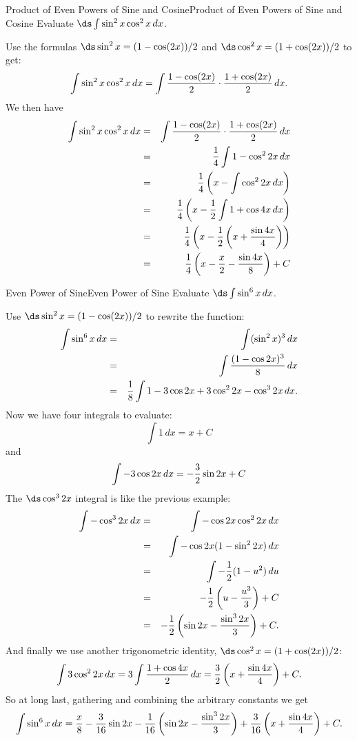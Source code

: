 \begin{example}{Product of Even Powers of Sine and Cosine}{Product of Even Powers of Sine and Cosine}\label{Product of Even Powers of Sine and Cosine}
Evaluate $\ds\int \sin^2x\cos^2x\,dx$. 
\end{example}

\begin{solution} 
Use the formulas
$\ds \sin^2x =(1-\cos(2x))/2$ and $\ds \cos^2x =(1+\cos(2x))/2$ to get:
$$
  \int \sin^2x\cos^2x\,dx=\int {1-\cos(2x)\over2}\cdot
  {1+\cos(2x)\over2}\,dx.
$$
We then have
\begin{eqnarray*}
\int \sin^2x\cos^2x\,dx&=&\int {1-\cos(2x)\over2}\cdot{1+\cos(2x)\over2}\,dx\\
&=&{1\over4}\int 1-\cos^2 2x\,dx\\
&=&{1\over4}\left(x-\int\cos^2 2x\,dx\right)\\
&=&{1\over4}\left(x-{1\over2}\int 1+\cos4x \,dx\right)\\
&=&{1\over4}\left(x-{1\over2}\left(x+{\sin 4x\over 4}\right)\right)\\
&=&{1\over4}\left(x-{x\over2}-{\sin 4x\over 8}\right)+C
\end{eqnarray*}
\end{solution}


\begin{example}{Even Power of Sine}{Even Power of Sine}\label{Even Power of Sine}
Evaluate $\ds\int \sin^6 x\,dx$.
\end{example}

\begin{solution} 
Use $\ds \sin^2x =(1-\cos(2x))/2$ to
rewrite the function:
\begin{eqnarray*}
  \int \sin^6 x\,dx&=&\int (\sin^2 x)^3\,dx\\
	&=&\int {(1-\cos 2x)^3\over 8}\,dx\\
  &=&{1\over 8}\int 1-3\cos 2x+3\cos^2 2x-\cos^3 2x\,dx.
\end{eqnarray*}
Now we have four integrals to evaluate:
$$\int 1\,dx=x+C$$
and
$$\int -3\cos 2x\,dx = -{3\over 2}\sin 2x+C$$
The $\ds \cos^3 2x$ integral is like the previous example:
\begin{eqnarray*}
  \int -\cos^3 2x\,dx&=&\int -\cos 2x\cos^2 2x\,dx\\
  &=&\int -\cos 2x(1-\sin^2 2x)\,dx\\
  &=&\int -{1\over 2}(1-u^2)\,du\\
  &=&-{1\over 2}\left(u-{u^3\over 3}\right)+C\\
  &=&-{1\over 2}\left(\sin 2x-{\sin^3 2x\over 3}\right)+C.
\end{eqnarray*}
And finally we use another trigonometric identity,
$\ds \cos^2x=(1+\cos(2x))/2$:
$$
  \int 3\cos^2 2x\,dx=3\int {1+\cos 4x\over 2}\,dx=
  {3\over 2}\left(x+{\sin 4x\over 4}\right)+C.
$$
So at long last, gathering and combining the arbitrary constants we get
$$
  \int \sin^6 x\,dx = {x\over8} -{3\over 16}\sin 2x 
  -{1\over 16}\left(\sin 2x-{\sin^3 2x\over 3}\right)
  +{3\over 16}\left(x+{\sin 4x\over 4}\right)+C.
$$\vskip-10pt
\end{solution}


